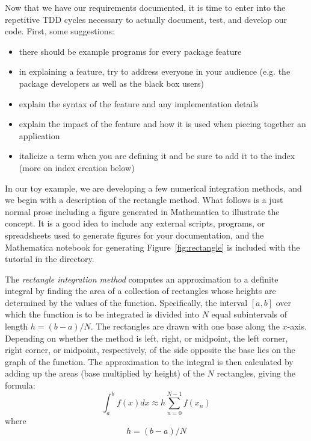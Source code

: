 \label{Rectangle_Integration}

\begin{seamlessnote}
  Now that we have our requirements documented, it is time to enter into the repetitive \seamless
  TDD cycles necessary to actually document, test, and develop our code. First, some suggestions:
  \begin{itemize}
    \item there should be example programs for every package feature
    \item in explaining a feature, try to address everyone in your audience
      (e.g. the package developers as well as the black box users)
    \item explain the syntax of the feature and any implementation details
    \item explain the impact of the feature and how it is used when piecing together
      an application
    \item italicize a term when you are defining it and be sure to add it to the 
      index (more on index creation below)  
  \end{itemize}

  In our toy example, we are developing a few numerical integration methods, and we begin with a description
  of the rectangle method. What follows is a just normal \latex prose including a figure generated in Mathematica
  to illustrate the concept. It is a good idea to include any external scripts, programs, or spreadsheets used to
  generate figures for your documentation, and the Mathematica notebook for generating Figure~\ref{fig:rectangle}
  is included with the tutorial in the  directory.
\end{seamlessnote}

The \textit{rectangle integration method}
computes an approximation to a 
definite integral by finding the area of a collection of rectangles whose heights are determined 
by the values of the function.  Specifically, the interval $[a,b]$ over which the function is to 
be integrated is divided into $N$ equal subintervals of length $h = (b-a)/N$. The rectangles are 
drawn with one base along the $x$-axis. Depending on whether the method is left, right, or midpoint,
the left corner, right corner, or midpoint, respectively, of the side opposite the base lies on the 
graph of the function. The approximation to the integral is 
then calculated by adding up the areas (base multiplied by height) of the $N$ rectangles, 
giving the formula:
\begin{equation}
  \int_a^b f(x) dx \approx h \sum_{n=0}^{N-1} f(x_n) \label{eq:rectangle}
\end{equation}
where
\begin{equation}
  h=(b-a)/N  \label{eq:subinterval-width}
\end{equation}

